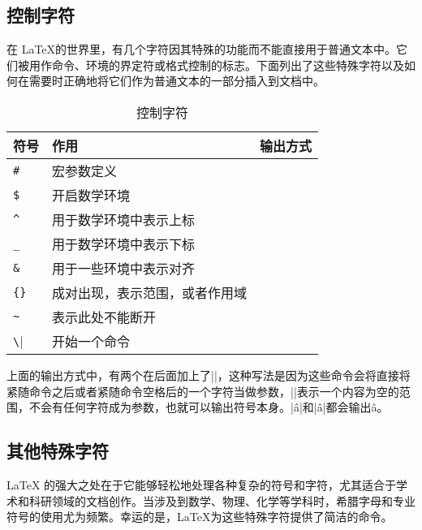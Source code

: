 {\subsection{控制字符}
在 \LaTeX 的世界里，有几个字符因其特殊的功能而不能直接用于普通文本中。它们被用作命令、环境的界定符或格式控制的标志。下面列出了这些特殊字符以及如何在需要时正确地将它们作为普通文本的一部分插入到文档中。
\begin{table}[H]
	\centering
	\begin{tabular}{lll} \toprule
		符号      & 作用                           & 输出方式                   \\ \midrule
		\verb|#|  & 宏参数定义                     & \texinline{\#}             \\
		\verb|$|  & 开启数学环境                   & \texinline{\$}             \\
		\verb|^|  & 用于数学环境中表示上标         & \texinline{\^{}}           \\
		\verb|_|  & 用于数学环境中表示下标         & \texinline{\_}             \\
		\verb|&|  & 用于一些环境中表示对齐         & \texinline{\&}             \\
		\verb|{}| & 成对出现，表示范围，或者作用域 & \texinline{\{ \}}          \\
		\verb|~|  & 表示此处不能断开               & \texinline{\~{}}           \\
		\verb|\|  & 开始一个命令                   & \texinline{\textbackslash} \\ \bottomrule
	\end{tabular}
	\caption{控制字符}
\end{table}

上面的输出方式中，有两个在后面加上了\texinline|{}|，这种写法是因为这些命令会将直接将紧随命令之后或者紧随命令空格后的一个字符当做参数，\texinline|{}|表示一个内容为空的范围，不会有任何字符成为参数，也就可以输出符号本身。\texinline|\^ a|和\texinline|\^a|都会输出\^a。
\subsection{其他特殊字符}
\LaTeX
的强大之处在于它能够轻松地处理各种复杂的符号和字符，尤其适合于学术和科研领域的文档创作。当涉及到数学、物理、化学等学科时，希腊字母和专业符号的使用尤为频繁。幸运的是，\LaTeX 为这些特殊字符提供了简洁的命令。
}

